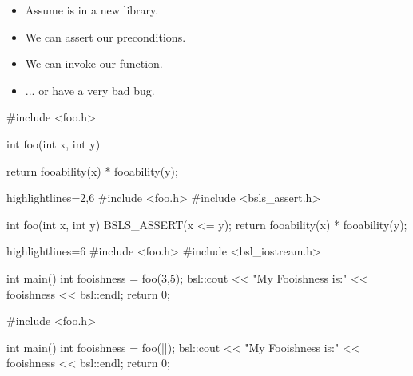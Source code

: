 \begin{frame}[fragile]
\begin{overprint}
  \begin{itemize}
  \item<1->{Assume  is in a new library.}
  \item<2->{We can assert our preconditions.}
  \item<3->{We can invoke our function.}
  \item<5->{... or have a very bad bug.}
  \end{itemize}
\end{overprint}

\begin{overprint}
\begin{cppcodebox}
#include <foo.h>
  

int foo(int x, int y)
{

  return fooability(x) * fooability(y);
}  
\end{cppcodebox}

\begin{cppcodebox*}{highlightlines={2,6}}
#include <foo.h>
#include <bsls\_assert.h>
  
int foo(int x, int y)
{
  BSLS_ASSERT(x <= y);
  return fooability(x) * fooability(y);
}  
\end{cppcodebox*}

\begin{cppcodebox*}{highlightlines={6}}
#include <foo.h>
#include <bsl\_iostream.h>
  
int main()
{
  int fooishness = foo(3,5);
  bsl::cout << "My Fooishness is:" << fooishness << bsl::endl;
  return 0;
}
\end{cppcodebox*}

\begin{cppcodebox}
#include <foo.h>

int main()
{
  int fooishness = foo(||);
  bsl::cout << "My Fooishness is:" << fooishness << bsl::endl;
  return 0;
}
\end{cppcodebox}

\end{overprint}
\end{frame}

